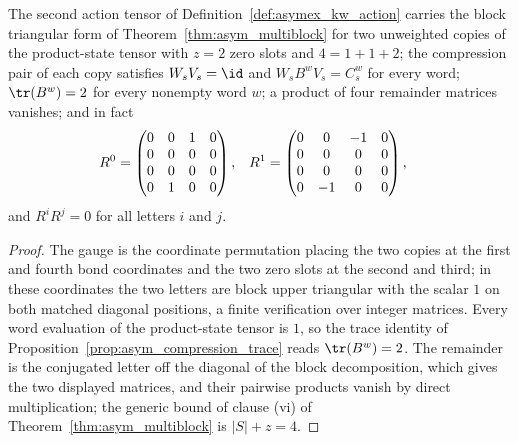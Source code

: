\begin{theorem}
    \label{thm:asymex_kw_ghz}
    \leanok
    The second action tensor of Definition~\ref{def:asymex_kw_action}
    carries the block triangular form of Theorem~\ref{thm:asym_multiblock}
    for two unweighted copies of the product-state tensor with $z=2$ zero
    slots and $4=1+1+2$; the compression pair of each copy satisfies
    $W_sV_s=\id$ and $W_sB^wV_s=C_s^w$ for every word;
    $\tr(B^w)=2$ for every nonempty word $w$; a product of four remainder
    matrices vanishes; and in fact
    \begin{align}
        R^0 & =\begin{pmatrix}
                   0 & 0 & 1 & 0 \\
                   0 & 0 & 0 & 0 \\
                   0 & 0 & 0 & 0 \\
                   0 & 1 & 0 & 0
               \end{pmatrix},
            & R^1
            & =\begin{pmatrix}
                   0 & 0  & -1 & 0 \\
                   0 & 0  & 0  & 0 \\
                   0 & 0  & 0  & 0 \\
                   0 & -1 & 0  & 0
               \end{pmatrix},
        \notag
    \end{align}
    and $R^iR^j=0$ for all letters $i$ and $j$.
\end{theorem}

\begin{proof}
    \leanok
    The gauge is the coordinate permutation placing the two copies at the
    first and fourth bond coordinates and the two zero slots at the second
    and third; in these coordinates the two letters are block upper
    triangular with the scalar $1$ on both matched diagonal positions, a
    finite verification over integer matrices. Every word evaluation of the
    product-state tensor is $1$, so the trace identity of
    Proposition~\ref{prop:asym_compression_trace} reads $\tr(B^w)=2$. The
    remainder is the conjugated letter off the diagonal of the block
    decomposition, which gives the two displayed matrices, and their
    pairwise products vanish by direct multiplication; the generic bound of
    clause (vi) of Theorem~\ref{thm:asym_multiblock} is $|S|+z=4$.
\end{proof}

